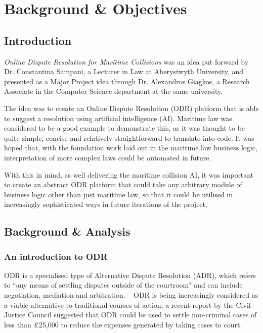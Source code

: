 \chapter{Background \& Objectives}

\section{Introduction}

\emph{Online Dispute Resolution for Maritime Collisions} was an idea put forward by Dr. Constantina Sampani, a Lecturer in Law at Aberystwyth University, and presented as a Major Project idea through Dr. Alexandros Giagkos, a Research Associate in the Computer Science department at the same university.

The idea was to create an Online Dispute Resolution (ODR) platform that is able to suggest a resolution using artificial intelligence (AI). Maritime law was considered to be a good example to demonstrate this, as it was thought to be quite simple, concise and relatively straightforward to translate into code. It was hoped that, with the foundation work laid out in the maritime law business logic, interpretation of more complex laws could be automated in future.

With this in mind, as well delivering the maritime collision AI, it was important to create an abstract ODR platform that could take any arbitrary module of business logic other than just maritime law, so that it could be utilised in increasingly sophisticated ways in future iterations of the project.

\section{Background \& Analysis}

\subsection{An introduction to ODR}

ODR is a specialised type of Alternative Dispute Resolution (ADR), which refers to ``any means of settling disputes outside of the courtroom" and can include negotiation, mediation and arbitration. ~\cite{define:ADR} ODR is being increasingly considered as a viable alternative  to traditional courses of action; a recent report by the Civil Justice Council suggested that ODR could be used to settle non-criminal cases of less than \pounds25,000 to reduce the expenses generated by taking cases to court.~\cite{report:odrPopular}

